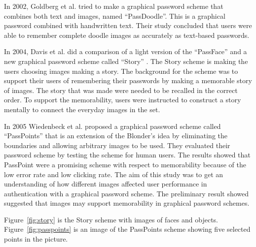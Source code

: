   In 2002, Goldberg et al. \cite{PassDoodle} tried to make a graphical password scheme that combines both text and images, named ``PassDoodle''. This is a graphical password combined with handwritten text. Their study concluded that users were able to remember complete doodle images as accurately as text-based passwords.

  In 2004, Davis et al. did a comparison of a light version of the ``PassFace'' and a new graphical password scheme called ``Story'' \cite{Davis}. The Story scheme is making the users choosing images making a story. The background for the scheme was to support their users of remembering their passwords by making a memorable story of images. The story that was made were needed to be recalled in the correct order. To support the memorability, users were instructed to construct a story mentally to connect the everyday images in the set.

  In 2005 Wiedenbeck et al. proposed a graphical password scheme called ``PassPoints'' \cite{PassPoints} that is an  extension of the Blonder's \cite{Blonder} idea by eliminating the boundaries and allowing arbitrary images to be used. They evaluated their password scheme by testing the scheme for human users. The results showed that PassPoint were a promising scheme with respect to memorability because of the low error rate and low clicking rate.
  The aim of this study was to get an understanding of how different images affected user performance in authentication with a graphical password scheme. The preliminary result showed suggested that images may support memorability in graphical password schemes.

  Figure~\ref{fig:story} is the Story scheme with images of faces and objects. Figure~\ref{fig:passpoints} is an image of the PassPoints scheme showing five selected points in the picture.

